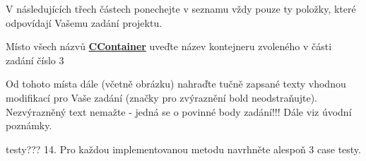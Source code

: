 
\begin{DoxyRefList}
\item[\label{todo__todo000001}%
\Hypertarget{todo__todo000001}%
page \hyperlink{index}{Úvod a zadání} ]V následujících třech částech ponechejte v seznamu vždy pouze ty položky, které odpovídají Vašemu zadání projektu.

Místo všech názvů {\bfseries  {\ttfamily \hyperlink{class_c_container}{C\+Container}}} uveďte název kontejneru zvoleného v části zadání číslo 3

Od tohoto místa dále (včetně obrázku) nahraďte tučně zapsané texty vhodnou modifikací pro Vaše zadání (značky pro zvýraznění bold neodstraňujte). Nezvýrazněný text nemažte -\/ jedná se o povinné body zadání!!! Dále viz úvodní poznámky.

testy??? 14. Pro každou implementovanou metodu navrhněte alespoň 3 case testy. 
\end{DoxyRefList}
